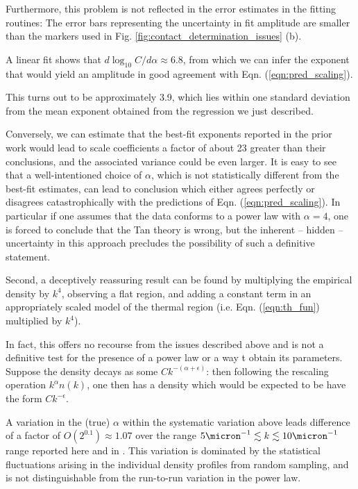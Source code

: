 	Furthermore, this problem is not reflected in the error estimates in the fitting routines: The error bars representing the uncertainty in fit amplitude are smaller than the markers used in Fig.
	\ref{fig:contact_determination_issues} (b).
	
	A linear fit shows that $d \log_{10} C/d\alpha \approx 6.8$, from which we can infer the exponent that would yield an amplitude in good agreement with Eqn.
	(\ref{eqn:pred_scaling}).
	
	This turns out to be approximately 3.9, which lies within one standard deviation from the mean exponent obtained from the regression we just described.
	
	Conversely, we can estimate that the best-fit exponents reported in the prior work would lead to scale coefficients a factor of about 23 greater than their conclusions, and the associated variance could be even larger.
	It is easy to see that a well-intentioned choice of $\alpha$, which is not statistically different from the best-fit estimates, can lead to  conclusion which either agrees perfectly or disagrees catastrophically with the predictions of Eqn.
	(\ref{eqn:pred_scaling}).
	In particular if one assumes that the data conforms to a power law with $\alpha=4$, one is forced to conclude that the Tan theory is wrong, but the inherent -- hidden -- uncertainty in this approach precludes the possibility of such a definitive statement.


	Second, a deceptively reassuring result can be found by multiplying the empirical density by $k^4$, observing a flat region, and adding a constant term in an appropriately scaled model of the thermal region (i.e.
	Eqn.
	(\ref{eqn:th_fun}) multiplied by $k^4$).
	
	In fact, this offers no recourse from the issues described above and is not a definitive test for the presence of a power law or a way t obtain its parameters.
	Suppose the density decays as some $C k^{-(\alpha+\epsilon)}$: then following the rescaling operation $k^\alpha n(k)$, one then has a density which would be expected to be have the form $C k^{-\epsilon}$.
	
	A variation in the (true) $\alpha$ within the systematic variation above leads difference of a factor of $O(2^{0.1})\approx1.07$ over the range $5\micron^{-1}\lesssim k\lesssim10\micron^{-1}$ range reported here and in \cite{Chang16}.
	This variation is dominated by the statistical fluctuations arising in the individual density profiles from random sampling, and is not distinguishable from the run-to-run variation in the power law.
	
